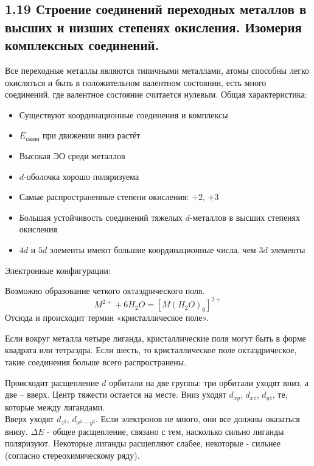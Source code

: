 \subsection{1.19 Строение соединений переходных металлов в высших и низших степенях окисления. Изомерия комплексных соединений.}
Все переходные металлы являются типичными металлами, атомы способны легко окисляться и быть в положительном валентном состоянии, есть много соединений, где валентное состояние считается нулевым.
Общая характеристика:
\begin{itemize}
	\item Существуют координационные соединения и комплексы
	\item $E_{\text{связи}}$ при движении вниз растёт
	\item Высокая ЭО среди металлов
	\item $d$-оболочка хорошо поляризуема 
	\item Самые распространенные степени окисления: $+2$, $+3$
	\item Большая устойчивость соединений тяжелых $d$-металлов в высших степенях окисления
	\item $4d$ и $5d$ элементы имеют большие координационные числа, чем $3d$ элементы
\end{itemize}
\begin{figure} [H]
	\centering {\texttt{[image: qq1]}}
\end{figure}
Электронные конфигурации:
\begin{figure} [H]
	\centering {\texttt{[image: qq2]}}
\end{figure}
Возможно образование четкого октаэдрического поля.  
\[
M^{2+} + 6H_2O = \left[M(H_2O)_6\right]^{2+}
\]
Отсюда и происходит термин «кристаллическое поле». 
\begin{figure} [H]
	\centering {\texttt{[image: qq3]}}
\end{figure}
Если вокруг металла четыре лиганда, кристаллические поля могут быть в форме квадрата или тетраэдра. Если шесть, то кристаллическое поле октаэдрическое, такие соединения больше всего распространены. 
\begin{figure} [H]
	\centering {\texttt{[image: qq4]}}
\end{figure}
Происходит расщепление $d$ орбитали на две группы: три орбитали уходят вниз, а две – вверх. Центр тяжести остается на месте. Вниз уходят $d_{xy}$, $d_{xz}$, $d_{yz}$, те, которые между лигандами. \\
Вверх уходят $d_{z^2}$, $d_{x^2 -y^2}$. Если электронов не много, они все должны оказаться внизу. $\Delta E$ - общее расщепление, связано с тем, насколько сильно лиганды поляризуют. Некоторые лиганды расщепляют слабее, некоторые - сильнее (согласно стереохимическому ряду).
